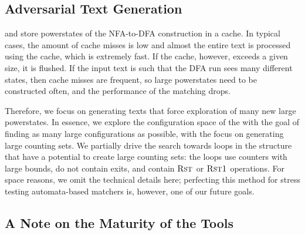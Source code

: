 \documentclass[acmsmall,screen]{acmart}
\begin{document}
\subsection{Adversarial Text Generation}\label{sec:redos_gen}

\retwo and \grep store powerstates of the NFA-to-DFA construction in a cache.
In typical cases, the amount of cache misses is low and almost the entire text
is processed using the cache, which is extremely fast.
If the cache, however, exceeds a given size, it is flushed.
If the input text is such that the DFA run sees many different states, then
cache misses are frequent, so large powerstates need to be constructed often, and
the performance of the matching drops.

Therefore, we focus on generating texts that force exploration of many new large
powerstates. 
In essence, we explore the configuration space of the \CSA with the goal of
finding as many large configurations as possible, with the focus on generating
large counting sets.
We partially drive the search towards loops in the \CSA structure that have a
potential to create large counting sets: the loops use counters with large bounds, do
not contain exits, and contain $\textsc{Rst}_{{}}{}$ or $\textsc{Rst1}_{{}}{}$ operations.
For space reasons, we omit the technical details here; perfecting
this method for stress testing automata-based matchers is, however, one of our future
goals.


\subsection{A Note on the Maturity of the Tools}\label{sec:label}
\end{document}
